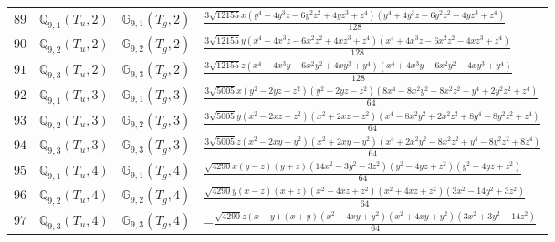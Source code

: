 \documentclass[fleqn,8pt,landscape]{jsarticle}
\begin{document}
\begin{table}[ht!]
\begin{center}
\begin{tabular}{cccl}
$ 89 $ & $ \mathbb{Q}_{9,1}(T_{u},2) $ & $ \mathbb{G}_{9,1}(T_{g},2) $ & $ \frac{3 \sqrt{12155} x \left(y^{4} - 4 y^{3} z - 6 y^{2} z^{2} + 4 y z^{3} + z^{4}\right) \left(y^{4} + 4 y^{3} z - 6 y^{2} z^{2} - 4 y z^{3} + z^{4}\right)}{128} $ \\
$ 90 $ & $ \mathbb{Q}_{9,2}(T_{u},2) $ & $ \mathbb{G}_{9,2}(T_{g},2) $ & $ \frac{3 \sqrt{12155} y \left(x^{4} - 4 x^{3} z - 6 x^{2} z^{2} + 4 x z^{3} + z^{4}\right) \left(x^{4} + 4 x^{3} z - 6 x^{2} z^{2} - 4 x z^{3} + z^{4}\right)}{128} $ \\
$ 91 $ & $ \mathbb{Q}_{9,3}(T_{u},2) $ & $ \mathbb{G}_{9,3}(T_{g},2) $ & $ \frac{3 \sqrt{12155} z \left(x^{4} - 4 x^{3} y - 6 x^{2} y^{2} + 4 x y^{3} + y^{4}\right) \left(x^{4} + 4 x^{3} y - 6 x^{2} y^{2} - 4 x y^{3} + y^{4}\right)}{128} $ \\
$ 92 $ & $ \mathbb{Q}_{9,1}(T_{u},3) $ & $ \mathbb{G}_{9,1}(T_{g},3) $ & $ \frac{3 \sqrt{5005} x \left(y^{2} - 2 y z - z^{2}\right) \left(y^{2} + 2 y z - z^{2}\right) \left(8 x^{4} - 8 x^{2} y^{2} - 8 x^{2} z^{2} + y^{4} + 2 y^{2} z^{2} + z^{4}\right)}{64} $ \\
$ 93 $ & $ \mathbb{Q}_{9,2}(T_{u},3) $ & $ \mathbb{G}_{9,2}(T_{g},3) $ & $ \frac{3 \sqrt{5005} y \left(x^{2} - 2 x z - z^{2}\right) \left(x^{2} + 2 x z - z^{2}\right) \left(x^{4} - 8 x^{2} y^{2} + 2 x^{2} z^{2} + 8 y^{4} - 8 y^{2} z^{2} + z^{4}\right)}{64} $ \\
$ 94 $ & $ \mathbb{Q}_{9,3}(T_{u},3) $ & $ \mathbb{G}_{9,3}(T_{g},3) $ & $ \frac{3 \sqrt{5005} z \left(x^{2} - 2 x y - y^{2}\right) \left(x^{2} + 2 x y - y^{2}\right) \left(x^{4} + 2 x^{2} y^{2} - 8 x^{2} z^{2} + y^{4} - 8 y^{2} z^{2} + 8 z^{4}\right)}{64} $ \\
$ 95 $ & $ \mathbb{Q}_{9,1}(T_{u},4) $ & $ \mathbb{G}_{9,1}(T_{g},4) $ & $ \frac{\sqrt{4290} x \left(y - z\right) \left(y + z\right) \left(14 x^{2} - 3 y^{2} - 3 z^{2}\right) \left(y^{2} - 4 y z + z^{2}\right) \left(y^{2} + 4 y z + z^{2}\right)}{64} $ \\
$ 96 $ & $ \mathbb{Q}_{9,2}(T_{u},4) $ & $ \mathbb{G}_{9,2}(T_{g},4) $ & $ \frac{\sqrt{4290} y \left(x - z\right) \left(x + z\right) \left(x^{2} - 4 x z + z^{2}\right) \left(x^{2} + 4 x z + z^{2}\right) \left(3 x^{2} - 14 y^{2} + 3 z^{2}\right)}{64} $ \\
$ 97 $ & $ \mathbb{Q}_{9,3}(T_{u},4) $ & $ \mathbb{G}_{9,3}(T_{g},4) $ & $ - \frac{\sqrt{4290} z \left(x - y\right) \left(x + y\right) \left(x^{2} - 4 x y + y^{2}\right) \left(x^{2} + 4 x y + y^{2}\right) \left(3 x^{2} + 3 y^{2} - 14 z^{2}\right)}{64} $ \\

\end{tabular}
\end{center}
\end{table}
\end{document}
